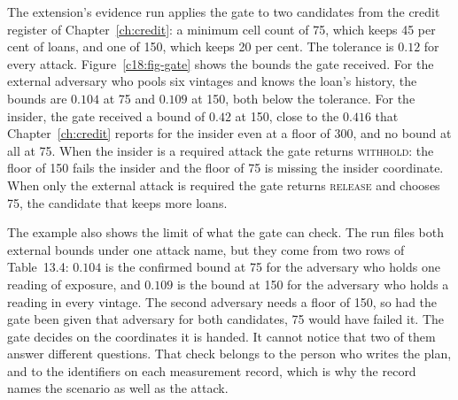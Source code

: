 The extension's evidence run applies the gate to two candidates from the credit register
of Chapter~\ref{ch:credit}: a minimum cell count of 75, which keeps 45 per cent of loans, and one of
150, which keeps 20 per cent. The tolerance is $0.12$ for every attack. Figure~\ref{c18:fig-gate} shows the
bounds the gate received. For the external adversary who pools six vintages and knows the
loan's history, the bounds are $0.104$ at 75 and $0.109$ at 150, both below the tolerance. For the
insider, the gate received a bound of $0.42$ at 150, close to the $0.416$ that Chapter~\ref{ch:credit} reports for
the insider even at a floor of 300, and no bound at all at 75. When the insider is a required
attack the gate returns \textsc{withhold}: the floor of 150 fails the insider and the floor of 75 is
missing the insider coordinate. When only the external attack is required the gate returns
\textsc{release} and chooses 75, the candidate that keeps more loans.

\syntheticnote


The example also shows the limit of what the gate can check. The run files both external
bounds under one attack name, but they come from two rows of Table~13.4: $0.104$ is the
confirmed bound at 75 for the adversary who holds one reading of exposure, and $0.109$ is the
bound at 150 for the adversary who holds a reading in every vintage. The second adversary
needs a floor of 150, so had the gate been given that adversary for both candidates, 75 would
have failed it. The gate decides on the coordinates it is handed. It cannot notice that two of
them answer different questions. That check belongs to the person who writes the plan, and
to the identifiers on each measurement record, which is why the record names the
scenario as well as the attack.

